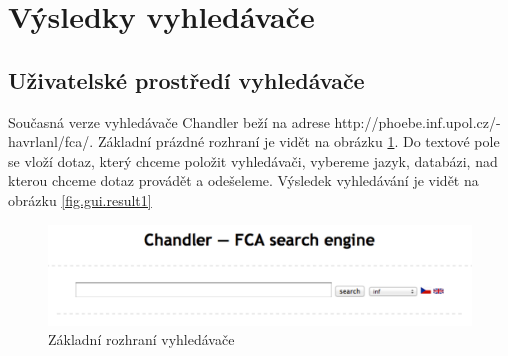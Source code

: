 \documentclass[12pt]{article}
\newcommand{\name}{Chandler}
\newcommand{\nameurl}{http://phoebe.inf.upol.cz/-havrlanl/fca/}
\newcommand{\ssection}[1]{\subsection{#1}}
\newcommand{\sssection}[1]{\subsubsection{#1}}
\newcommand{\addsp}[1]{\left<#1\right>}
\DeclareMathOperator{\tfidf}{tf-idf}
\begin{document}





\section{Výsledky vyhledávače}

\ssection{Uživatelské prostředí vyhledávače}
Současná verze vyhledávače \name{} beží na adrese \nameurl. Základní prázdné rozhraní je vidět na obrázku \ref{fig.gui.empty}. Do textové pole se vloží dotaz, který chceme položit vyhledávači, vybereme jazyk, databázi, nad kterou chceme dotaz provádět a odešeleme. Výsledek vyhledávání je vidět na obrázku \ref{fig.gui.result1}

\begin{figure}
  \centering
  \includegraphics[width=14cm]{obrazky/gui-zakladni.pdf}
  \caption{Základní rozhraní vyhledávače}
  \label{fig.gui.empty}
\end{figure}
\end{document}
